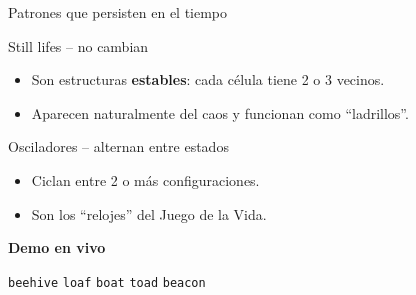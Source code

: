 \documentclass[10pt,aspectratio=169]{beamer}
\newcommand{\demo}[1]{\textcolor{democolor}{\texttt{#1}}}
\begin{document}
\begin{frame}{Patrones que persisten en el tiempo}

  \vspace{0.4cm}

  \begin{block}{Still lifes -- no cambian}
    \begin{itemize}
      \item Son estructuras \textbf{estables}: cada célula tiene 2 o 3 vecinos.
      \item Aparecen naturalmente del caos y funcionan como ``ladrillos''.
    \end{itemize}
  \end{block}

  \begin{block}{Osciladores -- alternan entre estados}
    \begin{itemize}
      \item Ciclan entre 2 o más configuraciones.
      \item Son los ``relojes'' del Juego de la Vida.
    \end{itemize}
  \end{block}

  \vspace{0.3cm}

  \begin{center}
    \textbf{Demo en vivo}

    \demo{beehive} \quad \demo{loaf} \quad \demo{boat}
    \quad \demo{toad} \quad \demo{beacon}
  \end{center}
\end{frame}
\end{document}
